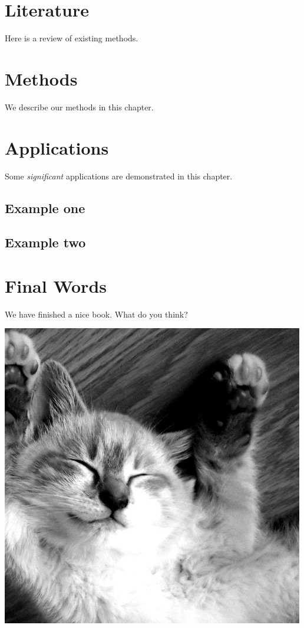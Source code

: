 \documentclass[
]{book}
\begin{document}
\hypertarget{literature}{%
\chapter{Literature}\label{literature}}

Here is a review of existing methods.

\hypertarget{methods}{%
\chapter{Methods}\label{methods}}

We describe our methods in this chapter.

\hypertarget{applications}{%
\chapter{Applications}\label{applications}}

Some \emph{significant} applications are demonstrated in this chapter.

\hypertarget{example-one}{%
\section{Example one}\label{example-one}}

\hypertarget{example-two}{%
\section{Example two}\label{example-two}}

\hypertarget{final-words}{%
\chapter{Final Words}\label{final-words}}

We have finished a nice book. What do you think?

\includegraphics{images/500.jpg}
\end{document}
